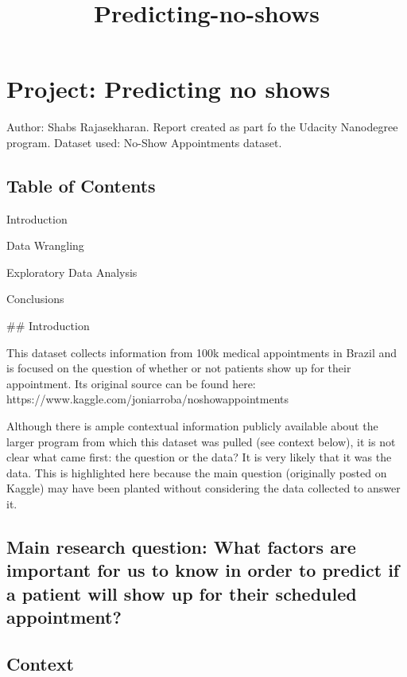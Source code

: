 \documentclass[11pt]{article}
\title{Predicting-no-shows}
\begin{document}
    
    
    \maketitle
    
    

    
    \section{Project: Predicting no
shows}\label{project-predicting-no-shows}

Author: Shabs Rajasekharan. Report created as part fo the Udacity
Nanodegree program. Dataset used: No-Show Appointments dataset.

\subsection{Table of Contents}\label{table-of-contents}

Introduction

Data Wrangling

Exploratory Data Analysis

Conclusions

     \#\# Introduction

This dataset collects information from 100k medical appointments in
Brazil and is focused on the question of whether or not patients show up
for their appointment. Its original source can be found here:
https://www.kaggle.com/joniarroba/noshowappointments

Although there is ample contextual information publicly available about
the larger program from which this dataset was pulled (see context
below), it is not clear what came first: the question or the data? It is
very likely that it was the data. This is highlighted here because the
main question (originally posted on Kaggle) may have been planted
without considering the data collected to answer it.

\subsection{Main research question: What factors are important for us to
know in order to predict if a patient will show up for their scheduled
appointment?}\label{main-research-question-what-factors-are-important-for-us-to-know-in-order-to-predict-if-a-patient-will-show-up-for-their-scheduled-appointment}

    \subsection{Context}\label{context}
\end{document}
